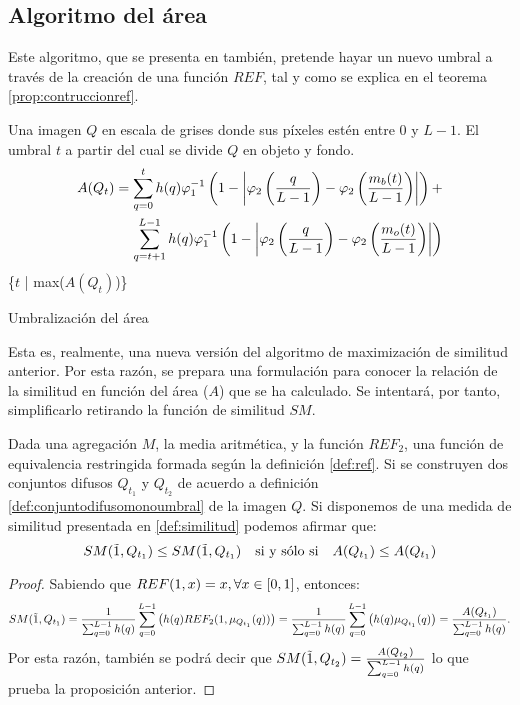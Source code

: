 \subsection{Algoritmo del área}

Este algoritmo, que se presenta en \cite{art:barrenechea} también, pretende hayar un nuevo umbral a través de la creación de una función $REF$, tal y como se explica en el teorema \ref{prop:contruccionref}.

\begin{algorithm}
\begin{algorithmic}[1]
\REQUIRE Una imagen $Q$ en escala de grises donde sus píxeles estén entre $0$ y $L-1$.
\ENSURE El umbral $t$ a partir del cual se divide $Q$ en objeto y fondo.
\STATE \begin{equation*}\begin{split}
A(Q_t)= \sum_{q=0}^{t} h(q)\varphi_1^{-1}\left(1-\left\vert\varphi_2\left(\frac{q}{L-1}\right)-\varphi_2\left(\frac{m_b(t)}{L-1}\right)\right\vert\right) + \\ \sum_{q=t+1}^{L-1} h(q)\varphi_1^{-1}\left(1-\left\vert\varphi_2\left(\frac{q}{L-1}\right)-\varphi_2\left(\frac{m_o(t)}{L-1}\right)\right\vert\right)
\end{split}\end{equation*}
\ENDFOR
\RETURN \{$t$ | max($A(Q_t)$)\}
\end{algorithmic}
\caption{Umbralización del área}\label{alg:algoritmo2}
\end{algorithm}

Esta es, realmente, una nueva versión del algoritmo de maximización de similitud anterior. Por esta razón, se prepara una formulación para conocer la relación de la similitud en función del área ($A$) que se ha calculado. Se intentará, por tanto, simplificarlo retirando la función de similitud $SM$.
\begin{proposition}
Dada una agregación $M$, la media aritmética, y la función $REF_2$, una función de equivalencia restringida formada según la definición \ref{def:ref}. Si se construyen dos conjuntos difusos $Q_{t_1}$ y $Q_{t_2}$ de acuerdo a definición \ref{def:conjuntodifusomonoumbral} de la imagen $Q$. Si disponemos de una medida de similitud presentada en \ref{def:similitud} podemos afirmar que:
$$SM(\tilda1, Q_{t_1})\leq SM(\tilda1, Q_{t_1})\quad \text{si y sólo si}\quad A(Q_{t_1})\leq A(Q_{t_1})$$
\end{proposition}
\begin{proof}
Sabiendo que $REF(1,x)=x, \forall x\in[0,1]$, entonces:
$$SM(\tilda1, Q_{t_1}) 
= \frac{1}{\sum_{q=0}^{L-1}h(q)}\sum_{q=0}^{L-1}\left( h(q)REF_2(1, \mu_{Q_{t_1}}(q))\right) 
= \frac{1}{\sum_{q=0}^{L-1}h(q)}\sum_{q=0}^{L-1}\left( h(q)\mu_{Q_{t_1}}(q)\right)
= \frac{A(Q_{t_1})}{\sum_{q=0}^{L-1}h(q)}.$$
Por esta razón, también se podrá decir que $SM(\tilda1, Q_{t_2}) = \frac{A(Q_{t_2})}{\sum_{q=0}^{L-1}h(q)}$ lo que prueba la proposición anterior.
\end{proof}

